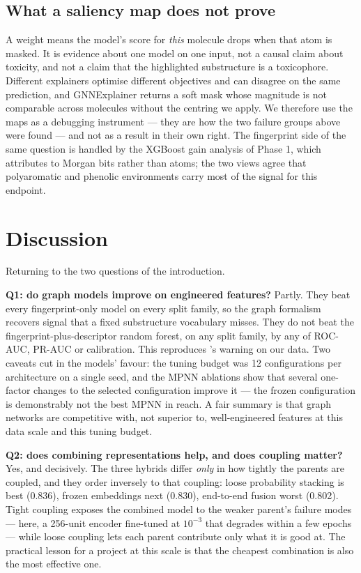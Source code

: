 \documentclass[conference]{IEEEtran}
\begin{document}
\subsection{What a saliency map does not prove}
A weight means the model's score for \emph{this} molecule drops when that atom is masked. It is
evidence about one model on one input, not a causal claim about toxicity, and not a claim that the
highlighted substructure is a toxicophore. Different explainers optimise different objectives and
can disagree on the same prediction, and GNNExplainer returns a soft mask whose magnitude is not
comparable across molecules without the centring we apply. We therefore use the maps as a
debugging instrument --- they are how the two failure groups above were found --- and not as a
result in their own right. The fingerprint side of the same question is handled by the XGBoost
gain analysis of Phase 1, which attributes to Morgan bits rather than atoms; the two views agree
that polyaromatic and phenolic environments carry most of the signal for this endpoint.

\section{Discussion}
Returning to the two questions of the introduction.

\textbf{Q1: do graph models improve on engineered features?} Partly. They beat every
fingerprint-only model on every split family, so the graph formalism recovers signal that a
fixed substructure vocabulary misses. They do not beat the fingerprint-plus-descriptor random
forest, on any split family, by any of ROC-AUC, PR-AUC or calibration. This reproduces
\citet{yang2019analyzing}'s warning on our data. Two caveats cut in the models' favour: the
tuning budget was 12 configurations per architecture on a single seed, and the MPNN ablations
show that several one-factor changes to the selected configuration improve it --- the frozen
configuration is demonstrably not the best MPNN in reach. A fair summary is that graph networks
are competitive with, not superior to, well-engineered features at this data scale and this
tuning budget.

\textbf{Q2: does combining representations help, and does coupling matter?} Yes, and
decisively. The three hybrids differ \emph{only} in how tightly the parents are coupled, and
they order inversely to that coupling: loose probability stacking is best (0.836), frozen
embeddings next (0.830), end-to-end fusion worst (0.802). Tight coupling exposes the combined
model to the weaker parent's failure modes --- here, a 256-unit encoder fine-tuned at
$10^{-3}$ that degrades within a few epochs --- while loose coupling lets each parent contribute
only what it is good at. The practical lesson for a project at this scale is that the cheapest
combination is also the most effective one.
\end{document}
